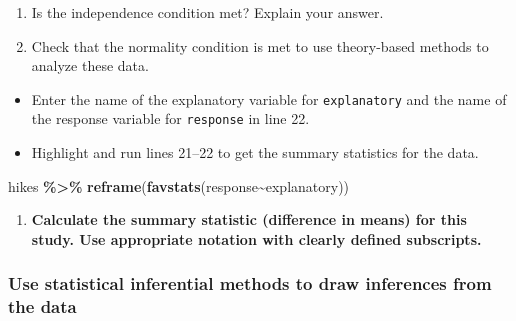 \documentclass[
]{report}
\newenvironment{Shaded}{\begin{snugshade}}{\end{snugshade}}
\newcommand{\FunctionTok}[1]{\textcolor[rgb]{0.13,0.29,0.53}{\textbf{#1}}}
\newcommand{\NormalTok}[1]{#1}
\newcommand{\SpecialCharTok}[1]{\textcolor[rgb]{0.81,0.36,0.00}{\textbf{#1}}}
\providecommand{\tightlist}{%
  \setlength{\itemsep}{0pt}\setlength{\parskip}{0pt}}
\begin{document}
\begin{enumerate}
\def\labelenumi{\arabic{enumi}.}
\setcounter{enumi}{3}
\item
  Is the independence condition met? Explain your answer.
  \vspace{0.8in}
\item
  Check that the normality condition is met to use theory-based methods to analyze these data.
\end{enumerate}

\vspace{0.8in}

\begin{itemize}
\item
  Enter the name of the explanatory variable for \texttt{explanatory} and the name of the response variable for \texttt{response} in line 22.
\item
  Highlight and run lines 21--22 to get the summary statistics for the data.
\end{itemize}

\begin{Shaded}
\begin{Highlighting}[]
\NormalTok{hikes }\SpecialCharTok{\%\textgreater{}\%}
  \FunctionTok{reframe}\NormalTok{(}\FunctionTok{favstats}\NormalTok{(response}\SpecialCharTok{\textasciitilde{}}\NormalTok{explanatory))}
\end{Highlighting}
\end{Shaded}

\newpage

\begin{enumerate}
\def\labelenumi{\arabic{enumi}.}
\setcounter{enumi}{5}
\tightlist
\item
  \textbf{Calculate the summary statistic (difference in means) for this study. Use appropriate notation with clearly defined subscripts.}
\end{enumerate}

\vspace{1in}

\hypertarget{use-statistical-inferential-methods-to-draw-inferences-from-the-data-4}{%
\subsubsection*{Use statistical inferential methods to draw inferences from the data}\label{use-statistical-inferential-methods-to-draw-inferences-from-the-data-4}}
\end{document}
